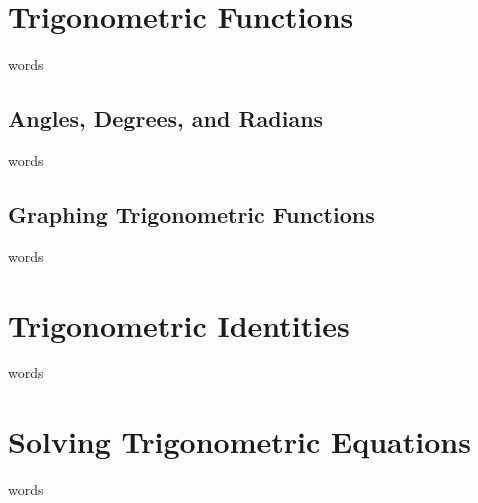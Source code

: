 \section{Trigonometric Functions}
words

\subsection{Angles, Degrees, and Radians}
words

\subsection{Graphing Trigonometric Functions}
words

\section{Trigonometric Identities}
words

\section{Solving Trigonometric Equations}
words


